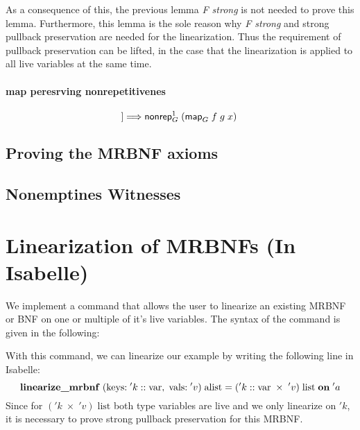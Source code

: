      As a consequence of this, the previous lemma \textit{F strong} is not needed to prove this lemma. Furthermore, this lemma is the sole reason why \textit{F strong} and strong pullback preservation are needed for the linearization. Thus the requirement of pullback preservation can be lifted, in the case that the linearization is applied to all live variables at the same time.

    \paragraph{map peresrving nonrepetitivenes}
      \begin{equation*}
        [\![\text{\textsf{nonrep}}_G^1\; x;\; \text{\textsf{bijective}} f]\!] \Longrightarrow \text{\textsf{nonrep}}_G^1\; (\text{\textsf{map}}_G\; f\; g\; x)
      \end{equation*} 
      
  \subsection{Proving the MRBNF axioms}

  \subsection{Nonemptines Witnesses}
  \label{subsec:wits}

  \section{Linearization of MRBNFs (In Isabelle)}
    We implement a command that allows the user to linearize an existing \ac{MRBNF} or \ac{BNF} on one or multiple of it's live variables. The syntax of the command is given in the following:

    

    With this command, we can linearize our example by writing the following line in Isabelle:
    \begin{equation*}
      \text{\textbf{linearize\_mrbnf}}\; (\text{keys:}\; 'k :: \text{var},\; \text{vals:}\; 'v)\; \text{alist} = ('k :: \text{var}\; \times\; 'v)\; \text{list}\; \text{\textbf{on}}\; 'a
    \end{equation*}
    Since for $('k\; \times\; 'v)\; \text{list}$ both type variables are live and we only linearize on $'k$, it is necessary to prove strong pullback preservation for this \ac{MRBNF}. 

